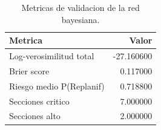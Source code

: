 \begin{table}
\caption{Metricas de validacion de la red bayesiana.}
\label{tab:bn_metricas}
\begin{tabular}{lr}
\toprule
Metrica & Valor \\
\midrule
Log-verosimilitud total & -27.160600 \\
Brier score & 0.117000 \\
Riesgo medio P(Replanif) & 0.718800 \\
Secciones critico & 7.000000 \\
Secciones alto & 2.000000 \\
\bottomrule
\end{tabular}
\end{table}
